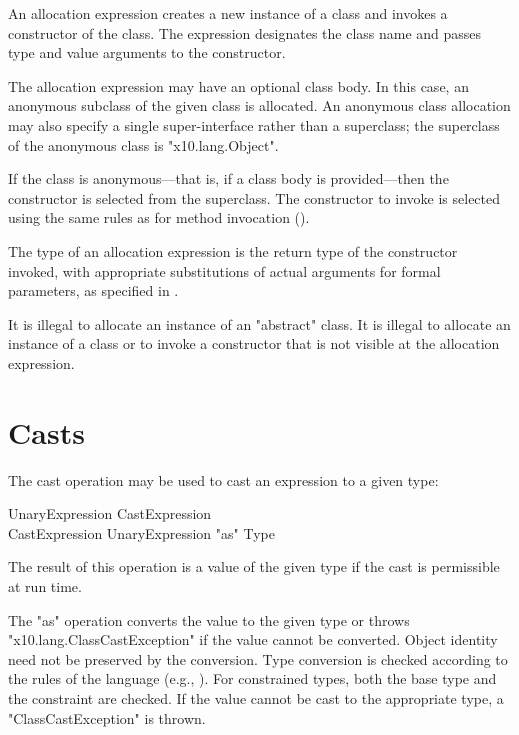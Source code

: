 An allocation expression creates a new instance of a class and
invokes a constructor of the class.
The expression designates the class name and passes
type and value arguments to the constructor.

The allocation expression may have an optional class body.
In this case, an anonymous subclass of the given class is
allocated.   An anonymous class allocation may also specify a
single super-interface rather than a superclass; the superclass
of the anonymous class is \xcd"x10.lang.Object".

If the class is anonymous---that is, if a class body is
provided---then the constructor is selected from the superclass.
The constructor to invoke is selected using the same rules as
for method invocation ().

The type of an allocation expression
is the return type of the constructor invoked, with appropriate
substitutions  of actual arguments for formal parameters, as
specified in .

It is illegal to allocate an instance of an \xcd"abstract" class.
It is illegal to allocate an instance of a class or to invoke a
constructor that is not visible at
the allocation expression.


\section{Casts}\label{ClassCast}

The cast operation may be used to cast an expression to a given type:

\begin{grammar}
UnaryExpression \: CastExpression \\
CastExpression \: UnaryExpression \xcd"as" Type \\
\end{grammar}

The result of this operation is a value of the given type if the cast
is permissible at run time.

The \xcd"as" operation converts the value to the given type or
throws \xcd"x10.lang.ClassCastException" if the value cannot be 
converted.
Object identity need not be preserved by the conversion.
Type conversion is checked according to the
rules of the \java{} language (e.g., \cite[\S 5.5]{jls2}).
For constrained types, both the base
type and the constraint are checked.
If the
value cannot be cast to the appropriate type, a
\xcd"ClassCastException"
is thrown.

